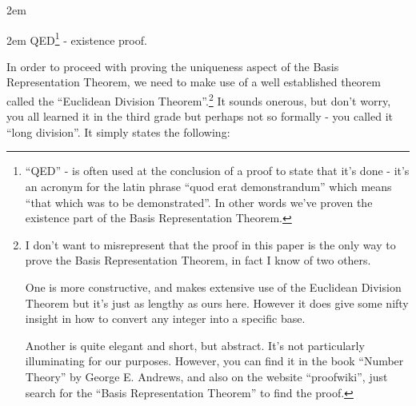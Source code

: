 \documentclass{article}
\newenvironment{jprIn}{\begin{adjustwidth}{2em}{}}{\end{adjustwidth}}
\begin{document}
\begin{jprIn}
\begin{jprIn}
QED\footnote{``QED'' - is often used at the conclusion of a proof to state that it’s
done - it’s an acronym for the latin phrase ``quod erat demonstrandum'' which means ``that which was to be demonstrated''.
In other words we’ve proven the existence part of the Basis Representation Theorem.} - existence proof.
\end{jprIn}
\end{jprIn}
\bigskip

\break
In order to proceed
with proving the uniqueness aspect of the Basis Representation Theorem, we
need to make use of a well established theorem
called the ``Euclidean Division Theorem''.\footnote{I don't want to misrepresent that the proof in
this paper is the only way to prove the
Basis Representation Theorem, in fact I know of two others. 

One is more constructive,
and makes extensive use of the Euclidean Division Theorem but it's just as lengthy as ours here. However it does give
some nifty insight in how to convert any integer into a specific base.

Another is quite elegant and short, but abstract. It's not particularly illuminating for our purposes.
However, you can find it in the book ``Number Theory'' by George E. Andrews, and also on
the website ``proofwiki'', just search for the ``Basis Representation Theorem'' to find the proof.}
It sounds onerous, but don’t worry, you all learned it
in the third grade but perhaps not so formally - you called it ``long division''. It simply states the following:
\end{document}
